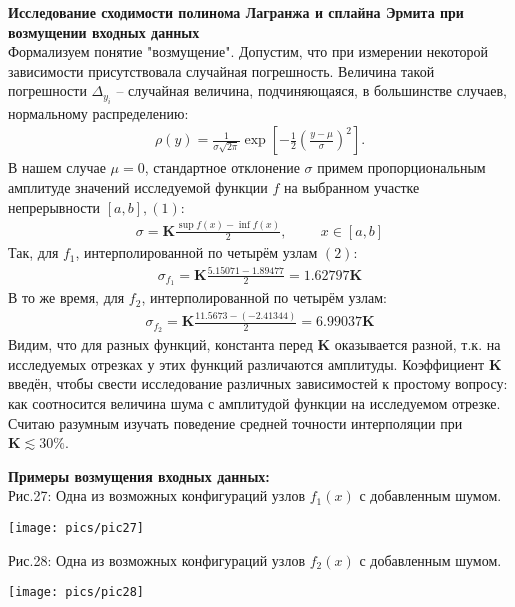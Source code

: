 \documentclass[a4paper, 14pt]{article}
\begin{document}
{\newpage
{\huge{\textbf{Исследование сходимости полинома Лагранжа и сплайна Эрмита при возмущении входных данных}}}\\
Формализуем понятие "возмущение". Допустим, что при измерении некоторой зависимости присутствовала случайная погрешность. Величина такой погрешности $\Delta_{y_i}$ -- случайная величина, подчиняющаяся, в большинстве случаев, нормальному распределению:
\begin{align}
    \rho(y) = \frac{1}{\sigma\sqrt{2\pi}}\exp\left[-\frac{1}{2}\left(\frac{y-\mu}{\sigma}\right)^2\right].
\end{align}
В нашем случае $\mu=0$, стандартное отклонение $\sigma$ примем пропорциональным амплитуде значений исследуемой функции $f$ на выбранном участке непрерывности $[a,b], (1)$:
\begin{align}
    \sigma = \mathbf{K} \frac{\sup f(x) - \inf f(x)}{2},
    \hspace{1cm} x\in[a,b]
\end{align}
Так, для $f_1$, интерполированной по четырём узлам $(2)$:
\begin{align}
    \sigma_{f_1} = \mathbf{K} \frac{5.15071 - 1.89477}{2} = 1.62797\mathbf{K}
\end{align}
В то же время, для $f_2$, интерполированной по четырём узлам:
\begin{align}
    \sigma_{f_2} = \mathbf{K} \frac{11.5673 - (-2.41344)}{2} = 6.99037\mathbf{K}
\end{align}
Видим, что для разных функций, константа перед $\mathbf{K}$ оказывается разной, т.к. на исследуемых отрезках у этих функций различаются амплитуды. Коэффициент $\mathbf{K}$ введён, чтобы свести исследование различных зависимостей к простому вопросу: как соотносится величина шума с амплитудой функции на исследуемом отрезке. Считаю разумным изучать поведение средней точности интерполяции при $\mathbf{K} \lesssim 30\%$.


\newpage
{\huge{\bf{Примеры возмущения входных данных:}}}\\
{\normalsize Рис.27: Одна из возможных конфигураций узлов $f_1(x)$ с добавленным шумом.}
\begin{center}
    \texttt{[image: pics/pic27]}
\end{center}
{\normalsize Рис.28: Одна из возможных конфигураций узлов $f_2(x)$ с добавленным шумом.}
\begin{center}
    \texttt{[image: pics/pic28]}
    \vspace{-0.7cm}
\end{center}

}
\end{document}
